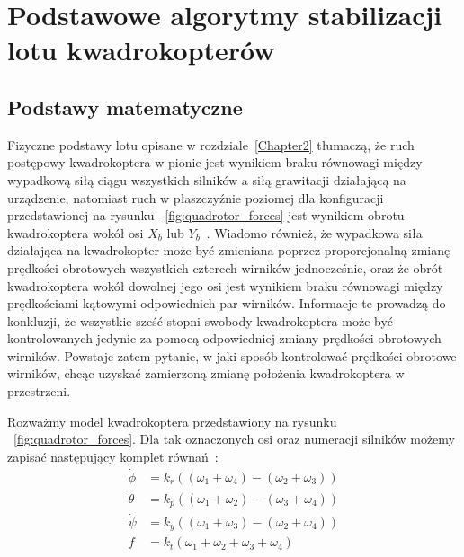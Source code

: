 


\chapter{Podstawowe algorytmy stabilizacji lotu kwadrokopterów} %

\label{Chapter3} %



\section{Podstawy matematyczne}

Fizyczne podstawy lotu opisane w rozdziale~\ref{Chapter2} tłumaczą, że ruch postępowy kwadrokoptera w pionie jest wynikiem braku równowagi między wypadkową siłą ciągu wszystkich silników a siłą grawitacji działającą na urządzenie, natomiast ruch w płaszczyźnie poziomej dla konfiguracji przedstawionej na rysunku ~\ref{fig:quadrotor_forces} jest wynikiem obrotu kwadrokoptera wokół osi $X_b$ lub $Y_b$~\cite{quadro8, quadro9}. Wiadomo również, że wypadkowa siła działająca na kwadrokopter może być zmieniana poprzez proporcjonalną zmianę prędkości obrotowych wszystkich czterech wirników jednocześnie, oraz że obrót kwadrokoptera wokół dowolnej jego osi jest wynikiem braku równowagi między prędkościami kątowymi odpowiednich par wirników. Informacje te prowadzą do konkluzji, że wszystkie sześć stopni swobody kwadrokoptera może być kontrolowanych jedynie za pomocą odpowiedniej zmiany prędkości obrotowych wirników. Powstaje zatem pytanie, w jaki sposób kontrolować prędkości obrotowe wirników, chcąc uzyskać zamierzoną zmianę położenia kwadrokoptera w przestrzeni. 

Rozważmy model kwadrokoptera przedstawiony na rysunku ~\ref{fig:quadrotor_forces}. Dla tak oznaczonych osi oraz numeracji silników możemy zapisać następujący komplet równań~\cite{quadro9}:
\begin{equation}
\begin{aligned}
	\dot{\phi} &= k_r((\omega_1 + \omega_4) - (\omega_2 + \omega_3)) \\
	\dot{\theta} &= k_p((\omega_1 + \omega_2) - (\omega_3 + \omega_4)) \\
	\dot{\psi} &= k_y((\omega_1 + \omega_3) - (\omega_2 + \omega_4)) \\
	f &= k_t(\omega_1 + \omega_2 + \omega_3 + \omega_4)
\end{aligned}
\end{equation}

